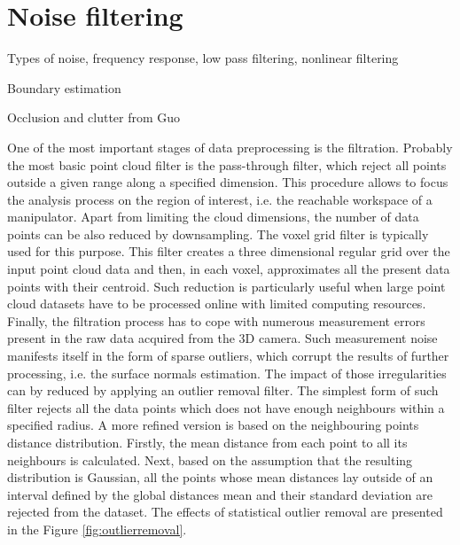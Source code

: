 \section{Noise filtering}
\label{sec:noise}

Types of noise, frequency response, low pass filtering, nonlinear filtering

Boundary estimation

Occlusion and clutter from Guo

One of the most important stages of data preprocessing is the filtration. Probably the most basic point cloud filter is the pass-through filter, which reject all points outside a given range along a specified dimension. This procedure allows to focus the analysis process on the region of interest, i.e. the reachable workspace of a manipulator. Apart from limiting the cloud dimensions, the number of data points can be also reduced by downsampling. The voxel grid filter is typically used for this purpose. This filter creates a three dimensional regular grid over the input point cloud data and then, in each voxel, approximates all the present data points with their centroid. Such reduction is particularly useful when large point cloud datasets have to be processed online with limited computing resources. Finally, the filtration process has to cope with numerous measurement errors present in the raw data acquired from the 3D camera. Such measurement noise 
manifests itself in the form of sparse outliers, which corrupt the results of further processing, i.e. the surface normals estimation. The impact of those irregularities can by reduced by applying an outlier removal filter. The simplest form of such filter rejects all the data points which does not have enough neighbours within a specified radius. A more refined version is based on the neighbouring points distance distribution. Firstly, the mean distance from each point to all its neighbours is calculated. Next, based on the assumption that the resulting distribution is Gaussian, all the points whose mean distances lay outside of an interval defined by the global distances mean and their standard deviation are rejected from the dataset. The effects of statistical outlier removal are presented in the Figure \ref{fig:outlierremoval}.

